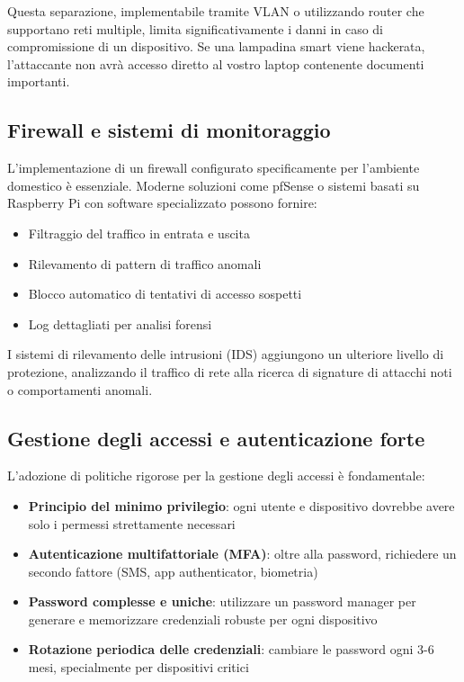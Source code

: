 Questa separazione, implementabile tramite VLAN o utilizzando router che supportano reti multiple, limita significativamente i danni in caso di compromissione di un dispositivo. Se una lampadina smart viene hackerata, l'attaccante non avrà accesso diretto al vostro laptop contenente documenti importanti.

\subsection{Firewall e sistemi di monitoraggio}

L'implementazione di un firewall configurato specificamente per l'ambiente domestico è essenziale. Moderne soluzioni come pfSense o sistemi basati su Raspberry Pi con software specializzato possono fornire:

\begin{itemize}
    \item Filtraggio del traffico in entrata e uscita
    \item Rilevamento di pattern di traffico anomali
    \item Blocco automatico di tentativi di accesso sospetti
    \item Log dettagliati per analisi forensi
\end{itemize}

I sistemi di rilevamento delle intrusioni (IDS) aggiungono un ulteriore livello di protezione, analizzando il traffico di rete alla ricerca di signature di attacchi noti o comportamenti anomali.

\subsection{Gestione degli accessi e autenticazione forte}

L'adozione di politiche rigorose per la gestione degli accessi è fondamentale:

\begin{itemize}
    \item \textbf{Principio del minimo privilegio}: ogni utente e dispositivo dovrebbe avere solo i permessi strettamente necessari
    \item \textbf{Autenticazione multifattoriale (MFA)}: oltre alla password, richiedere un secondo fattore (SMS, app authenticator, biometria)
    \item \textbf{Password complesse e uniche}: utilizzare un password manager per generare e memorizzare credenziali robuste per ogni dispositivo
    \item \textbf{Rotazione periodica delle credenziali}: cambiare le password ogni 3-6 mesi, specialmente per dispositivi critici
\end{itemize}

